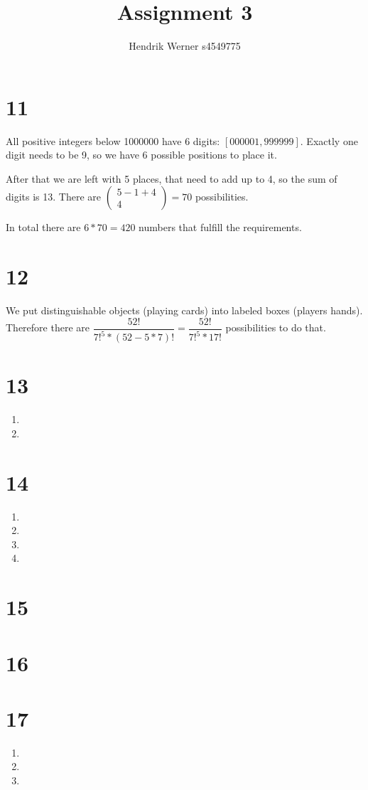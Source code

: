 \documentclass[12pt]{article}
\title{Assignment 3}
\author{
	Hendrik Werner s4549775
}
\begin{document}
\maketitle

\section*{11}
All positive integers below 1000000 have 6 digits: $[000001, 999999]$. Exactly one digit needs to be 9, so we have 6 possible positions to place it.

After that we are left with 5 places, that need to add up to 4, so the sum of digits is 13. There are $\begin{pmatrix}
	5 - 1 + 4 \\ 4
\end{pmatrix} = 70$ possibilities.

In total there are $6 * 70 = 420$ numbers that fulfill the requirements.

\section*{12}
We put distinguishable objects (playing cards) into labeled boxes (players hands). Therefore there are $\dfrac{52!}{7!^5 * (52 - 5 * 7)!} =  \dfrac{52!}{7!^5 * 17!}$ possibilities to do that.

\section*{13}
\begin{enumerate}[a]
	\item %
	\item %
\end{enumerate}

\section*{14}
\begin{enumerate}[a]
	\item %
	\item %
	\item %
	\item %
\end{enumerate}

\section*{15}

\section*{16}

\section*{17}
\begin{enumerate}[a]
	\item %
	\item %
	\item %
\end{enumerate}
\end{document}
